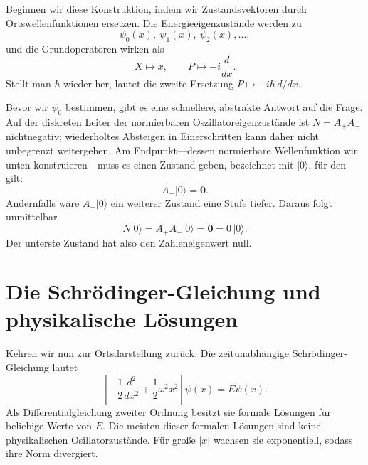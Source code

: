 Beginnen wir diese Konstruktion, indem wir Zustandsvektoren durch Ortswellenfunktionen ersetzen. Die Energieeigenzustände werden zu
\[
\psi_{0}(x),\ \psi_{1}(x),\ \psi_{2}(x),\ldots,
\]
und die Grundoperatoren wirken als
\begin{equation}
X\longmapsto x,\qquad
P\longmapsto -i\frac{d}{dx}.
\end{equation}
Stellt man \(\hbar\) wieder her, lautet die zweite Ersetzung
\(P\mapsto-i\hbar\,d/dx\).

Bevor wir \(\psi_{0}\) bestimmen, gibt es eine schnellere, abstrakte Antwort auf die Frage. Auf der diskreten Leiter der normierbaren Oszillatoreigenzustände ist \(N=A_{+}A_{-}\) nichtnegativ; wiederholtes Absteigen in Einerschritten kann daher nicht unbegrenzt weitergehen. Am Endpunkt---dessen normierbare Wellenfunktion wir unten konstruieren---muss es einen Zustand geben, bezeichnet mit \(\lvert0\rangle\), für den gilt:
\begin{equation}
A_{-}\lvert0\rangle=\mathbf 0.
\end{equation}
Andernfalls wäre \(A_{-}\lvert0\rangle\) ein weiterer Zustand eine Stufe tiefer. Daraus folgt unmittelbar
\begin{equation}
N\lvert0\rangle
=A_{+}A_{-}\lvert0\rangle
=\mathbf 0
=0\,\lvert0\rangle.
\end{equation}
Der unterste Zustand hat also den Zahleneigenwert null.

\begin{classroomqa}
\end{classroomqa}

\section{Die Schr\"odinger-Gleichung und physikalische Lösungen}

Kehren wir nun zur Ortsdarstellung zurück. Die zeitunabhängige Schr\"odinger-Gleichung lautet
\begin{equation}
\left[
-\frac12\frac{d^{2}}{dx^{2}}
+\frac12\omega^{2}x^{2}
\right]\psi(x)=E\psi(x).
\end{equation}
Als Differentialgleichung zweiter Ordnung besitzt sie formale Lösungen für beliebige Werte von \(E\). Die meisten dieser formalen Lösungen sind keine physikalischen Osillatorzustände. Für große \(\lvert x\rvert\) wachsen sie exponentiell, sodass ihre Norm divergiert.

